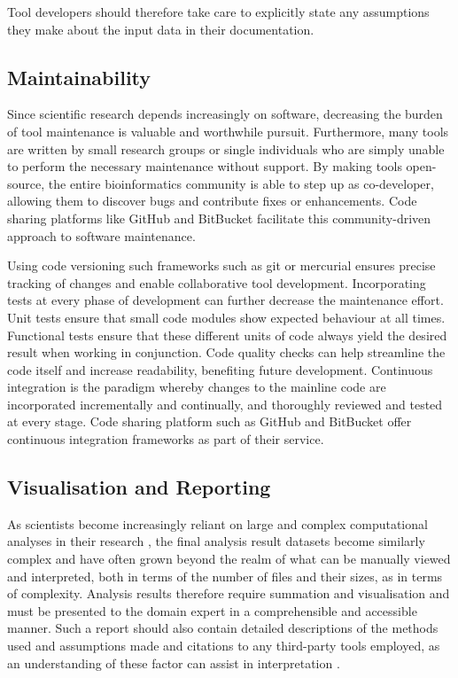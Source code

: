 \begin{justify}
 Tool developers should therefore take care to explicitly state any assumptions they make about the input data in their documentation.

\subsection{Maintainability}
Since scientific research depends increasingly on software, decreasing the burden of tool maintenance is valuable and worthwhile pursuit. Furthermore, many tools are written by small research groups or single individuals who are simply unable to perform the necessary maintenance without support. By making tools open-source, the entire bioinformatics community is able to step up as co-developer, allowing them to discover bugs and contribute fixes or enhancements. Code sharing platforms like GitHub \cite{url-github} and BitBucket \cite{url-bitbucket} facilitate this community-driven approach to software maintenance.

Using code versioning such frameworks such as git \cite{url-git} or mercurial \cite{url-mercurial} ensures precise tracking of changes and enable collaborative tool development. Incorporating tests at every phase of development can further decrease the maintenance effort. Unit tests ensure that small code modules show expected behaviour at all times. Functional tests ensure that these different units of code always yield the desired result when working in conjunction. Code quality checks can help streamline the code itself and increase readability, benefiting future development. Continuous integration is the paradigm whereby changes to the mainline code are incorporated incrementally and continually, and thoroughly reviewed and tested at every stage. Code sharing platform such as GitHub and BitBucket offer continuous integration frameworks as part of their service.

\subsection{Visualisation and Reporting}

As scientists become increasingly reliant on large and complex computational analyses in their research \cite{chen2014big}, the final analysis result datasets become similarly complex and have  often grown beyond the realm of what can be manually viewed and interpreted, both in terms of the number of files and their sizes, as in terms of complexity. Analysis results therefore require summation and visualisation and must be presented to the domain expert in a comprehensible and accessible manner. Such a report should also contain detailed descriptions of the methods used and assumptions made and citations to any third-party tools employed, as an understanding of these factor can assist in interpretation \cite{kumar2007bioinformatics}.


\end{justify}
